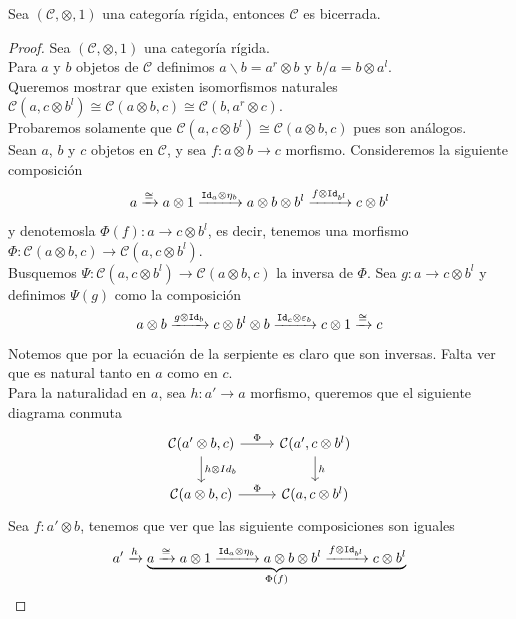 \documentclass[../main.tex]{subfiles}
\begin{document}
    \begin{prop}
        Sea $(\mathcal{C}, \otimes, 1)$ una categoría  rígida, entonces $\mathcal{C}$ es bicerrada.  
    \end{prop}
    \begin{proof}
        Sea $(\mathcal{C}, \otimes , 1)$ una categoría rígida. \\
        Para $a$ y $b$ objetos de $\mathcal{C}$ definimos $a \backslash b = a^r \otimes b$ y $b/a = b \otimes a^l$.\\
        Queremos mostrar que existen isomorfismos naturales $\mathcal{C}(a,c\otimes b^l) \cong \mathcal{C}(a\otimes b, c) \cong \mathcal{C}(b, a^r\otimes c)$. \\
        Probaremos solamente que $\mathcal{C}(a,c\otimes b^l) \cong \mathcal{C}(a\otimes b, c)$ pues son análogos. \\
        Sean $a$, $b$ y $c$ objetos en $\mathcal{C}$, y sea $f:a \otimes b \to c$ morfismo. Consideremos la siguiente composición
        $$a \xrightarrow[]{\cong} a \otimes 1 \xrightarrow[]{\texttt{Id}_a \otimes \eta_b} a \otimes b \otimes b^l \xrightarrow[]{f \otimes \texttt{Id}_{b^l}} c \otimes b^l$$
        y denotemosla $\Phi (f):a \to c \otimes b^l$, es decir, tenemos una morfismo $\Phi: \mathcal{C}(a \otimes b, c) \to \mathcal{C}(a, c \otimes b^l)$. \\
        Busquemos $\Psi: \mathcal{C}(a, c \otimes b^l) \to \mathcal{C}(a \otimes b, c)$ la inversa de $\Phi$. Sea $g: a \to c \otimes b^l$ y definimos $\Psi(g)$ como la composición
        $$a \otimes b \xrightarrow[]{g \otimes \texttt{Id}_b} c \otimes b^l \otimes b \xrightarrow[]{\texttt{Id}_c \otimes \varepsilon_b} c \otimes 1 \xrightarrow[]{\cong} c$$
        Notemos que por la ecuación de la serpiente es claro que son inversas. Falta ver que es natural tanto en $a$ como en $c$. \\
        Para la naturalidad en $a$, sea $h:a' \to a$ morfismo, queremos que el siguiente diagrama conmuta 
        \[
            \begin{tikzcd}
                \mathcal{C}(a' \otimes b, c) \arrow{r}{\Phi} \arrow{d}{h \otimes Id_b} & \mathcal{C}(a',c \otimes b^l) \arrow{d}{h}\\
                \mathcal{C}(a \otimes b, c) \arrow{r}{\Phi} & \mathcal{C}(a,c \otimes b^l)
            \end{tikzcd}
        \]
        Sea $f:a' \otimes b$, tenemos que ver que las siguiente composiciones son iguales
        $$a' \xrightarrow[]{h} \underbrace{a \xrightarrow[]{\cong} a \otimes 1 \xrightarrow[]{\texttt{Id}_a \otimes \eta_b} a \otimes b \otimes b^l \xrightarrow[]{f \otimes \texttt{Id}_{b^l}} c \otimes b^l}_{\Phi(f)} $$

\end{proof}
\end{document}
